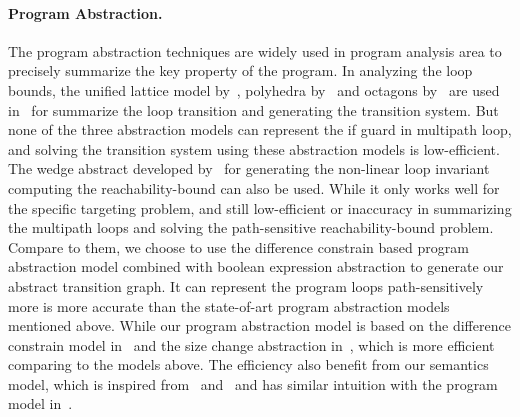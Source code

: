 
\paragraph*{Program Abstraction.}
The program abstraction techniques are widely used in program analysis area to precisely summarize the key property of the program.
In analyzing the loop bounds, the unified lattice model by~\cite{CousotH78}, polyhedra by~\cite{CousotC77} and octagons by~\cite{Mine06} are used in~\cite{GulwaniZ10} for summarize the loop transition and generating the transition system.
But none of the three abstraction models can represent the if guard in multipath loop, and solving the transition system using these abstraction models is low-efficient.
The wedge abstract developed by~\cite{KincaidCBR18} for generating the non-linear loop invariant
computing the reachability-bound can also be used. While it only works well for the specific targeting problem, and still low-efficient or inaccuracy in summarizing the multipath loops and solving the path-sensitive reachability-bound problem. 
Compare to them, we choose to use the difference constrain based program abstraction model combined with boolean expression abstraction to generate our abstract transition graph. It can represent the program loops path-sensitively more is more accurate than the state-of-art program abstraction models mentioned above.
While our program abstraction model is based on the difference constrain model in~\cite{SinnZV17} and the size change abstraction in~\cite{SinnZV14}, which is more efficient comparing to the models above. The efficiency also benefit from our
semantics model, which is inspired from~\cite{Cousot19a} and~\cite{Cousot19} and has similar intuition with the program model in~\cite{SinnZV17}.


